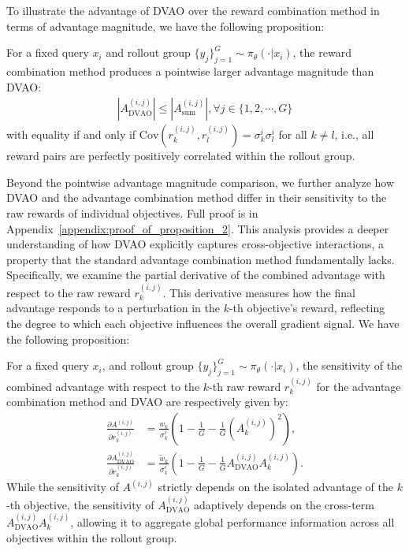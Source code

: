 \documentclass{llmxive}
\providecommand{\Cov}{\mathrm{Cov}}
\begin{document}
To illustrate the advantage of DVAO over the reward combination method in terms of advantage magnitude, we have the following proposition:
\begin{proposition}
\label{proposition_2}
    For a fixed query $x_i$ and rollout group $\{y_j\}_{j=1}^G \sim \pi_\theta(\cdot | x_i)$, the reward combination method produces a pointwise larger advantage magnitude than DVAO:
    \begin{align}
        \left| A_\text{DVAO}^{(i,j)} \right| \le \left| A_\text{sum}^{(i,j)} \right|, \forall j \in \{1, 2, \cdots, G\}
    \end{align}
    with equality if and only if $\Cov\left(r_k^{(i,j)}, r_l^{(i,j)}\right) = \sigma_k^i \sigma_l^i$ for all $k \neq l$, i.e., all reward pairs are perfectly positively correlated within the rollout group.
\end{proposition}

Beyond the pointwise advantage magnitude comparison, we further analyze how DVAO and the advantage combination method differ in their sensitivity to the raw rewards of individual objectives. Full proof is in Appendix~\ref{appendix:proof_of_proposition_2}. This analysis provides a deeper understanding of how DVAO explicitly captures cross-objective interactions, a property that the standard advantage combination method fundamentally lacks. Specifically, we examine the partial derivative of the combined advantage with respect to the raw reward $r_k^{(i,j)}$. This derivative measures how the final advantage responds to a perturbation in the $k$-th objective's reward, reflecting the degree to which each objective influences the overall gradient signal. We have the following proposition:
\begin{proposition}
\label{proposition_3}
    For a fixed query $x_i$, and rollout group $\{y_j\}_{j=1}^G \sim \pi_\theta(\cdot | x_i)$, the sensitivity of the combined advantage with  respect to the $k$-th raw reward $r_k^{(i,j)}$ for the advantage combination method and DVAO are respectively given by:
    \begin{align}
        \frac{\partial A^{(i,j)}}{\partial r_k^{(i,j)}} &= \frac{w_k}{\sigma_k^i} \left( 1 - \frac{1}{G} - \frac{1}{G} \left(A_k^{(i,j)}\right)^2 \right), \\
        \frac{\partial A_\text{DVAO}^{(i,j)}}{\partial r_k^{(i,j)}} &= \frac{\tilde{w}_k}{\sigma_k^i} \left( 1 - \frac{1}{G} - \frac{1}{G} A_\text{DVAO}^{(i,j)} A_k^{(i,j)} \right).
    \end{align}
    While the sensitivity of $A^{(i,j)}$ strictly depends on the isolated advantage of the $k$-th objective, the sensitivity of $A_\text{DVAO}^{(i,j)}$ adaptively depends on the cross-term $A_\text{DVAO}^{(i,j)} A_k^{(i,j)}$, allowing it to aggregate global performance information across all objectives within the rollout group.
\end{proposition}
\end{document}
